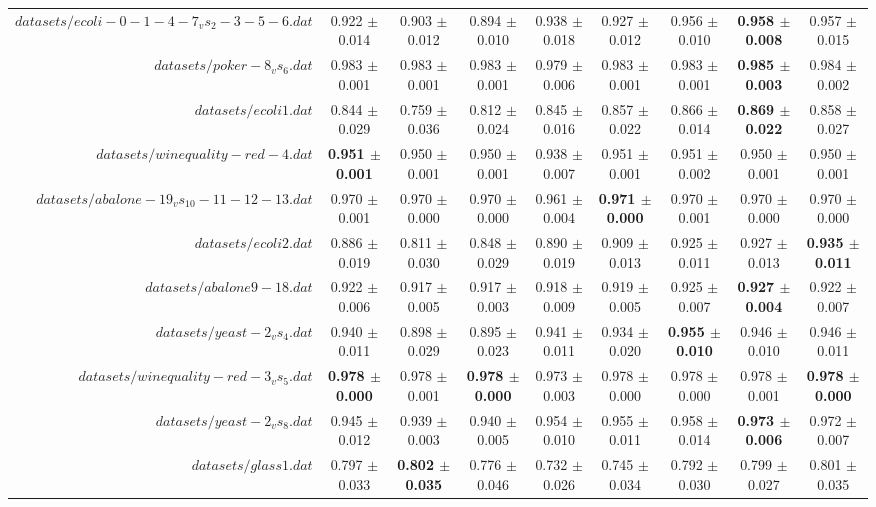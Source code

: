 \begin{table}[!ht]
{\begin{tabular}{r c c c c c c c c}
$datasets/ecoli-0-1-4-7_vs_2-3-5-6.dat$ & 0.922 $\pm$ 0.014 & 0.903 $\pm$ 0.012 & 0.894 $\pm$ 0.010 & 0.938 $\pm$ 0.018 & 0.927 $\pm$ 0.012 & 0.956 $\pm$ 0.010 & \textbf{0.958 $\pm$ 0.008} & 0.957 $\pm$ 0.015 \\
$datasets/poker-8_vs_6.dat$ & 0.983 $\pm$ 0.001 & 0.983 $\pm$ 0.001 & 0.983 $\pm$ 0.001 & 0.979 $\pm$ 0.006 & 0.983 $\pm$ 0.001 & 0.983 $\pm$ 0.001 & \textbf{0.985 $\pm$ 0.003} & 0.984 $\pm$ 0.002 \\
$datasets/ecoli1.dat$ & 0.844 $\pm$ 0.029 & 0.759 $\pm$ 0.036 & 0.812 $\pm$ 0.024 & 0.845 $\pm$ 0.016 & 0.857 $\pm$ 0.022 & 0.866 $\pm$ 0.014 & \textbf{0.869 $\pm$ 0.022} & 0.858 $\pm$ 0.027 \\
$datasets/winequality-red-4.dat$ & \textbf{0.951 $\pm$ 0.001} & 0.950 $\pm$ 0.001 & 0.950 $\pm$ 0.001 & 0.938 $\pm$ 0.007 & 0.951 $\pm$ 0.001 & 0.951 $\pm$ 0.002 & 0.950 $\pm$ 0.001 & 0.950 $\pm$ 0.001 \\
$datasets/abalone-19_vs_10-11-12-13.dat$ & 0.970 $\pm$ 0.001 & 0.970 $\pm$ 0.000 & 0.970 $\pm$ 0.000 & 0.961 $\pm$ 0.004 & \textbf{0.971 $\pm$ 0.000} & 0.970 $\pm$ 0.001 & 0.970 $\pm$ 0.000 & 0.970 $\pm$ 0.000 \\
$datasets/ecoli2.dat$ & 0.886 $\pm$ 0.019 & 0.811 $\pm$ 0.030 & 0.848 $\pm$ 0.029 & 0.890 $\pm$ 0.019 & 0.909 $\pm$ 0.013 & 0.925 $\pm$ 0.011 & 0.927 $\pm$ 0.013 & \textbf{0.935 $\pm$ 0.011} \\
$datasets/abalone9-18.dat$ & 0.922 $\pm$ 0.006 & 0.917 $\pm$ 0.005 & 0.917 $\pm$ 0.003 & 0.918 $\pm$ 0.009 & 0.919 $\pm$ 0.005 & 0.925 $\pm$ 0.007 & \textbf{0.927 $\pm$ 0.004} & 0.922 $\pm$ 0.007 \\
$datasets/yeast-2_vs_4.dat$ & 0.940 $\pm$ 0.011 & 0.898 $\pm$ 0.029 & 0.895 $\pm$ 0.023 & 0.941 $\pm$ 0.011 & 0.934 $\pm$ 0.020 & \textbf{0.955 $\pm$ 0.010} & 0.946 $\pm$ 0.010 & 0.946 $\pm$ 0.011 \\
$datasets/winequality-red-3_vs_5.dat$ & \textbf{0.978 $\pm$ 0.000} & 0.978 $\pm$ 0.001 & \textbf{0.978 $\pm$ 0.000} & 0.973 $\pm$ 0.003 & 0.978 $\pm$ 0.000 & 0.978 $\pm$ 0.000 & 0.978 $\pm$ 0.001 & \textbf{0.978 $\pm$ 0.000} \\
$datasets/yeast-2_vs_8.dat$ & 0.945 $\pm$ 0.012 & 0.939 $\pm$ 0.003 & 0.940 $\pm$ 0.005 & 0.954 $\pm$ 0.010 & 0.955 $\pm$ 0.011 & 0.958 $\pm$ 0.014 & \textbf{0.973 $\pm$ 0.006} & 0.972 $\pm$ 0.007 \\
$datasets/glass1.dat$ & 0.797 $\pm$ 0.033 & \textbf{0.802 $\pm$ 0.035} & 0.776 $\pm$ 0.046 & 0.732 $\pm$ 0.026 & 0.745 $\pm$ 0.034 & 0.792 $\pm$ 0.030 & 0.799 $\pm$ 0.027 & 0.801 $\pm$ 0.035 \\

\end{tabular}}
\end{table}
